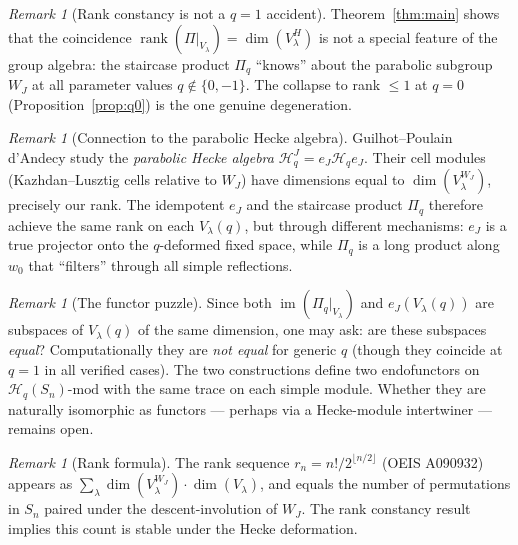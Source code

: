 \documentclass[12pt]{article}
\theoremstyle{remark}
\newtheorem{remark}[theorem]{Remark}
\theoremstyle{definition}
\begin{document}
\begin{remark}[Rank constancy is not a $q=1$ accident]
\label{rem:not-accident}
Theorem~\ref{thm:main} shows that the coincidence
$\operatorname{rank}(\Pi|_{V_\lambda}) = \dim(V_\lambda^H)$ is not a special feature of the
group algebra: the staircase product $\Pi_q$ ``knows'' about the parabolic subgroup $W_J$ at
all parameter values $q \notin \{0,-1\}$.  The collapse to rank $\leq 1$ at $q = 0$
(Proposition~\ref{prop:q0}) is the one genuine degeneration.
\end{remark}

\begin{remark}[Connection to the parabolic Hecke algebra]
\label{rem:parabolic}
Guilhot--Poulain d'Andecy \cite{GuilhotPdA2025} study the \emph{parabolic Hecke algebra}
$\mathcal{H}_q^J = e_J \mathcal{H}_q e_J$.  Their cell modules (Kazhdan--Lusztig cells
relative to $W_J$) have dimensions equal to $\dim(V_\lambda^{W_J})$, precisely our rank.
The idempotent $e_J$ and the staircase product $\Pi_q$ therefore achieve the same rank on each
$V_\lambda(q)$, but through different mechanisms: $e_J$ is a true projector onto the
$q$-deformed fixed space, while $\Pi_q$ is a long product along $w_0$ that ``filters''
through all simple reflections.
\end{remark}

\begin{remark}[The functor puzzle]
\label{rem:functor}
Since both $\operatorname{im}(\Pi_q|_{V_\lambda})$ and $e_J(V_\lambda(q))$ are subspaces of
$V_\lambda(q)$ of the same dimension, one may ask: are these subspaces \emph{equal}?
Computationally they are \emph{not equal} for generic $q$ (though they coincide at $q = 1$ in
all verified cases).  The two constructions define two endofunctors on
$\mathcal{H}_q(S_n)\text{-mod}$ with the same trace on each simple module.  Whether they are
naturally isomorphic as functors — perhaps via a Hecke-module intertwiner — remains open.
\end{remark}

\begin{remark}[Rank formula]
The rank sequence $r_n = n!/2^{\lfloor n/2\rfloor}$ (OEIS A090932) appears as
$\sum_\lambda \dim(V_\lambda^{W_J}) \cdot \dim(V_\lambda)$, and equals the number of
permutations in $S_n$ paired under the descent-involution of $W_J$.  The rank constancy
result implies this count is stable under the Hecke deformation.
\end{remark}

\end{document}

